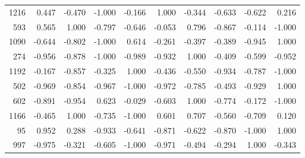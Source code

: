 \begin{longtable}{rrrrrrrrrr}
  1216 &  0.447 & -0.470 & -1.000 & -0.166 &  1.000 & -0.344 & -0.633 & -0.622 &  0.216 \\
   593 &  0.565 &  1.000 & -0.797 & -0.646 & -0.053 &  0.796 & -0.867 & -0.114 & -1.000 \\
  1090 & -0.644 & -0.802 & -1.000 &  0.614 & -0.261 & -0.397 & -0.389 & -0.945 &  1.000 \\
   274 & -0.956 & -0.878 & -1.000 & -0.989 & -0.932 &  1.000 & -0.409 & -0.599 & -0.952 \\
  1192 & -0.167 & -0.857 & -0.325 &  1.000 & -0.436 & -0.550 & -0.934 & -0.787 & -1.000 \\
   502 & -0.969 & -0.854 & -0.967 & -1.000 & -0.972 & -0.785 & -0.493 & -0.929 &  1.000 \\
   602 & -0.891 & -0.954 &  0.623 & -0.029 & -0.603 &  1.000 & -0.774 & -0.172 & -1.000 \\
  1166 & -0.465 &  1.000 & -0.735 & -1.000 &  0.601 &  0.707 & -0.560 & -0.709 &  0.120 \\
    95 &  0.952 &  0.288 & -0.933 & -0.641 & -0.871 & -0.622 & -0.870 & -1.000 &  1.000 \\
   997 & -0.975 & -0.321 & -0.605 & -1.000 & -0.971 & -0.494 & -0.294 &  1.000 & -0.343 \\
\end{longtable}
